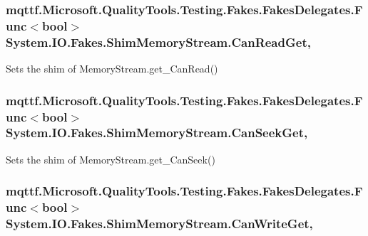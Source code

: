 \hypertarget{class_system_1_1_i_o_1_1_fakes_1_1_shim_memory_stream_a7cbb3dfd2900cb4a4ccb810343dfbfa4}{
\subsubsection[{Can\-Read\-Get}]{\setlength{\rightskip}{0pt plus 5cm}mqttf.\-Microsoft.\-Quality\-Tools.\-Testing.\-Fakes.\-Fakes\-Delegates.\-Func$<$bool$>$ System.\-I\-O.\-Fakes.\-Shim\-Memory\-Stream.\-Can\-Read\-Get\hspace{0.3cm}{\ttfamily [get]}, {\ttfamily [set]}}}\label{class_system_1_1_i_o_1_1_fakes_1_1_shim_memory_stream_a7cbb3dfd2900cb4a4ccb810343dfbfa4}


Sets the shim of Memory\-Stream.\-get\-\_\-\-Can\-Read()

\hypertarget{class_system_1_1_i_o_1_1_fakes_1_1_shim_memory_stream_a35d48510dfce7a8d0ca8cf7471b96802}{
\subsubsection[{Can\-Seek\-Get}]{\setlength{\rightskip}{0pt plus 5cm}mqttf.\-Microsoft.\-Quality\-Tools.\-Testing.\-Fakes.\-Fakes\-Delegates.\-Func$<$bool$>$ System.\-I\-O.\-Fakes.\-Shim\-Memory\-Stream.\-Can\-Seek\-Get\hspace{0.3cm}{\ttfamily [get]}, {\ttfamily [set]}}}\label{class_system_1_1_i_o_1_1_fakes_1_1_shim_memory_stream_a35d48510dfce7a8d0ca8cf7471b96802}


Sets the shim of Memory\-Stream.\-get\-\_\-\-Can\-Seek()

\hypertarget{class_system_1_1_i_o_1_1_fakes_1_1_shim_memory_stream_a97816d7624a49885d4e825273c1d0656}{
\subsubsection[{Can\-Write\-Get}]{\setlength{\rightskip}{0pt plus 5cm}mqttf.\-Microsoft.\-Quality\-Tools.\-Testing.\-Fakes.\-Fakes\-Delegates.\-Func$<$bool$>$ System.\-I\-O.\-Fakes.\-Shim\-Memory\-Stream.\-Can\-Write\-Get\hspace{0.3cm}{\ttfamily [get]}, {\ttfamily [set]}}}\label{class_system_1_1_i_o_1_1_fakes_1_1_shim_memory_stream_a97816d7624a49885d4e825273c1d0656}


